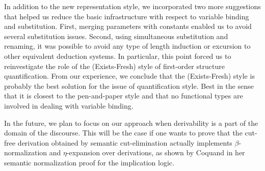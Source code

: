 \documentclass{svjour3}                     %
\newcommand{\be}{\beta}
\begin{document}
In addition to the new representation style, we incorporated two more
suggestions that helped us reduce the basic infrastructure with respect
to variable binding and substitution. First, merging parameters with
constants enabled us to avoid several substitution issues. Second, using
simultaneous substitution and renaming, it was possible to avoid any
type of length induction or excursion to other equivalent deduction
systems. In particular, this point forced us to reinvestigate the role
of the (Exists-Fresh) style of first-order structure
quantification. From our experience, we conclude that the (Exists-Fresh)
style is probably the best solution for the issue of quantification
style. Best in the sense that it is closest to the pen-and-paper style
and that no functional types are involved in dealing with variable
binding. 

In the future, we plan to focus on our approach when derivability is a
part of the domain of the discourse. This will be the case if one wants
to prove that the cut-free derivation obtained by semantic
cut-elimination actually implements $\be$-normalization and
$\eta$-expansion over derivations, as shown by Coquand
\cite{cCoquand93,cCoquand02} in her semantic normalization proof for the
implication logic.



%
%
\end{document}
